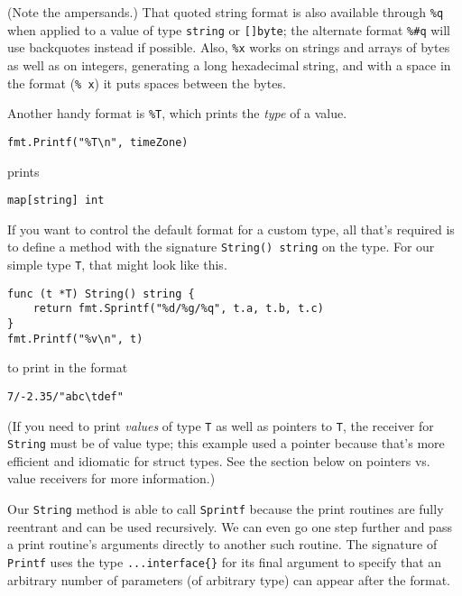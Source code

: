 (Note the ampersands.) That quoted string format is also available
through \texttt{\%q} when applied to a value of type \texttt{string} or
\texttt{{[}{]}byte}; the alternate format \texttt{\%\#q} will use
backquotes instead if possible. Also, \texttt{\%x} works on strings and
arrays of bytes as well as on integers, generating a long hexadecimal
string, and with a space in the format (\texttt{\%~x}) it puts spaces
between the bytes.

Another handy format is \texttt{\%T}, which prints the \emph{type} of a
value.

\begin{Verbatim}[frame=single]
fmt.Printf("%T\n", timeZone)
\end{Verbatim}

prints

\begin{Verbatim}[frame=single]
map[string] int
\end{Verbatim}

If you want to control the default format for a custom type, all that's
required is to define a method with the signature
\texttt{String() string} on the type. For our simple type \texttt{T},
that might look like this.

\begin{Verbatim}[frame=single]
func (t *T) String() string {
    return fmt.Sprintf("%d/%g/%q", t.a, t.b, t.c)
}
fmt.Printf("%v\n", t)
\end{Verbatim}

to print in the format

\begin{Verbatim}[frame=single]
7/-2.35/"abc\tdef"
\end{Verbatim}

(If you need to print \emph{values} of type \texttt{T} as well as
pointers to \texttt{T}, the receiver for \texttt{String} must be of
value type; this example used a pointer because that's more efficient
and idiomatic for struct types. See the section below on
pointers vs. value receivers for more information.)

Our \texttt{String} method is able to call \texttt{Sprintf} because the
print routines are fully reentrant and can be used recursively. We can
even go one step further and pass a print routine's arguments directly
to another such routine. The signature of \texttt{Printf} uses the type
\texttt{...interface\{\}} for its final argument to specify that an
arbitrary number of parameters (of arbitrary type) can appear after the
format.


